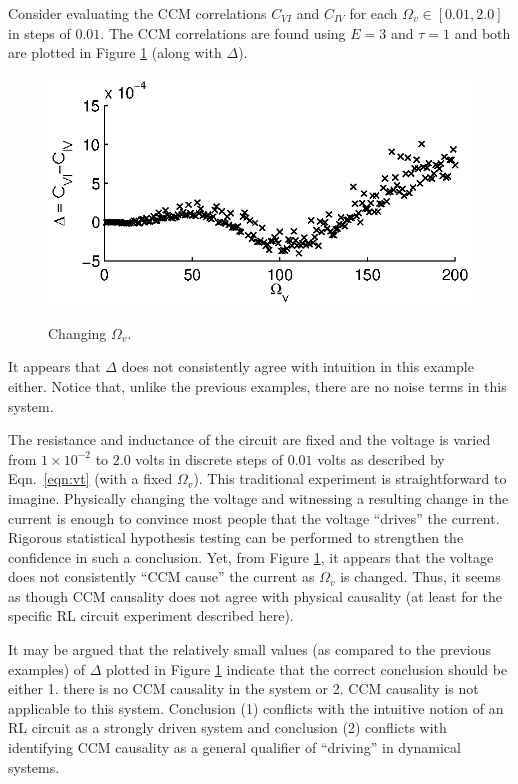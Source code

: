 \documentclass[a4paper,11pt,twocolumn]{article}
\begin{document}
Consider evaluating the CCM correlations $C_{VI}$ and $C_{IV}$ for each $\Omega_v\in[0.01,2.0]$ in steps of $0.01$.  The CCM correlations are found using $E=3$ and $\tau=1$ and both are plotted in Figure \ref{fig:Av} (along with $\Delta$).
\begin{figure}[ht]
\includegraphics[scale=0.9]{RLCircuitVaryV_Freq.eps} \\
\caption{Changing $\Omega_v$.}
\label{fig:Av}
\end{figure}
It appears that $\Delta$ does not consistently agree with intuition in this example either.  Notice that, unlike the previous examples, there are no noise terms in this system.  

The resistance and inductance of the circuit are fixed and the voltage is varied from $1\times 10^{-2}$ to $2.0$ volts in discrete steps of $0.01$ volts as described by Eqn.\ \ref{eqn:vt} (with a fixed $\Omega_v$).  This traditional experiment is straightforward to imagine.  Physically changing the voltage and witnessing a resulting change in the current is enough to convince most people that the voltage ``drives'' the current.  Rigorous statistical hypothesis testing can be performed to strengthen the confidence in such a conclusion.  Yet, from Figure \ref{fig:Av}, it appears that the voltage does not consistently ``CCM cause'' the current as $\Omega_v$ is changed.  Thus, it seems as though CCM causality does not agree with physical causality (at least for the specific RL circuit experiment described here).

It may be argued that the relatively small values (as compared to the previous examples) of $\Delta$ plotted in Figure \ref{fig:Av} indicate that the correct conclusion should be either 1. there is no CCM causality in the system or 2. CCM causality is not applicable to this system.  Conclusion (1) conflicts with the intuitive notion of an RL circuit as a strongly driven system and conclusion (2) conflicts with identifying CCM causality as a general qualifier of ``driving'' in dynamical systems.
\end{document}

